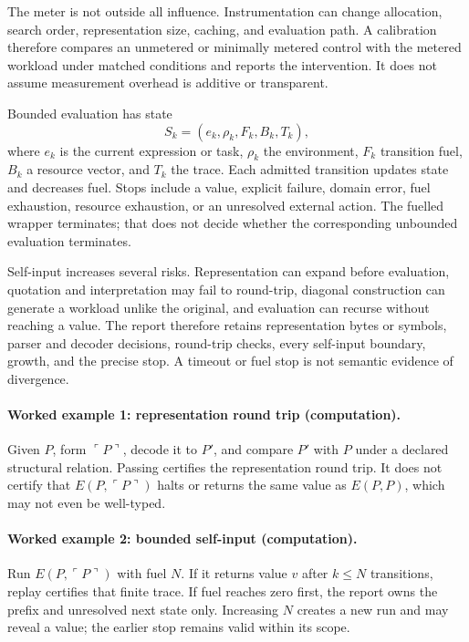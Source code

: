 The meter is not outside all influence.  Instrumentation can change allocation, search order, representation size,
caching, and evaluation path.  A calibration therefore compares an unmetered or minimally metered control with the
metered workload under matched conditions and reports the intervention.  It does not assume measurement overhead is
additive or transparent.

Bounded evaluation has state
\[
                         S_k=(e_k,\rho_k,F_k,B_k,T_k),
\]
where \(e_k\) is the current expression or task, \(\rho_k\) the environment, \(F_k\) transition fuel, \(B_k\) a
resource vector, and \(T_k\) the trace.  Each admitted transition updates state and decreases fuel.  Stops include a
value, explicit failure, domain error, fuel exhaustion, resource exhaustion, or an unresolved external action.  The
fuelled wrapper terminates; that does not decide whether the corresponding unbounded evaluation terminates.

Self-input increases several risks.  Representation can expand before evaluation, quotation and interpretation may
fail to round-trip, diagonal construction can generate a workload unlike the original, and evaluation can recurse
without reaching a value.  The report therefore retains representation bytes or symbols, parser and decoder
decisions, round-trip checks, every self-input boundary, growth, and the precise stop.  A timeout or fuel stop is not
semantic evidence of divergence.

\paragraph{Worked example 1: representation round trip (computation).}
Given \(P\), form \(\ulcorner P\urcorner\), decode it to \(P'\), and compare \(P'\) with \(P\) under a declared
structural relation.  Passing certifies the representation round trip.  It does not certify that
\(E(P,\ulcorner P\urcorner)\) halts or returns the same value as \(E(P,P)\), which may not even be well-typed.

\paragraph{Worked example 2: bounded self-input (computation).}
Run \(E(P,\ulcorner P\urcorner)\) with fuel \(N\).  If it returns value \(v\) after \(k\leq N\) transitions, replay
certifies that finite trace.  If fuel reaches zero first, the report owns the prefix and unresolved next state only.
Increasing \(N\) creates a new run and may reveal a value; the earlier stop remains valid within its scope.

